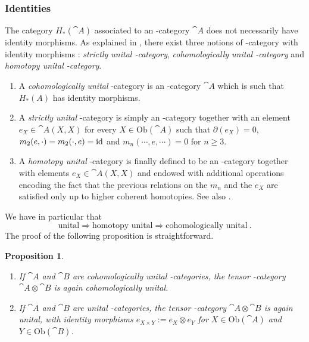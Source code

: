 \documentclass[twoside, 11pt]{amsart}
\newtheorem{proposition}[definition]{Proposition}
\theoremstyle{remark}
\begin{document}
\subsubsection{Identities}

The category $H_*(\cat{A})$ associated to an \Ainf -category $\cat{A}$ does not necessarily have identity morphisms. As explained in \cite[Section 1.2]{Seidel08}, there exist three notions of \Ainf -category with identity morphisms : \textit{strictly unital \Ainf -category}, \textit{cohomologically unital \Ainf -category} and \textit{homotopy unital \Ainf -category}. 
\begin{enumerate}[leftmargin=*]
\item A \textit{cohomologically unital} \Ainf -category is an \Ainf -category $\cat{A}$ which is such that $H_*(A)$ has identity morphisms.
\item A \textit{strictly unital} \Ainf -category is simply an \Ainf -category together with an element $e_X \in \cat{A} (X ,X )$ for every $X \in \mathrm{Ob}(\cat{A})$ such that $\partial (e_X) = 0$, $m_2 (e , \cdot ) = m_2 (\cdot , e ) = \mathrm{id}$ and $m_n ( \cdots , e , \cdots ) = 0 \text { for } n \geq 3$.
\item A \textit{homotopy unital} \Ainf -category is finally defined to be an \Ainf -category together with elements $e_X \in \cat{A} (X ,X )$ and endowed with additional operations encoding the fact that the previous relations on the $m_n$ and the $e_X$ are satisfied only up to higher coherent homotopies. See also \cite[Section 6.1]{HirshMilles12}.
\end{enumerate}
We have in particular that
\[  \text{unital} \Rightarrow \text{homotopy unital} \Rightarrow \text{cohomologically unital} \ . \]
The proof of the following proposition is straightforward.

\begin{proposition}
\begin{enumerate}[leftmargin=*]
\item If $\cat{A}$ and $\cat{B}$ are cohomologically unital \Ainf -categories, the tensor \Ainf -category $\cat{A} \otimes \cat{B}$ is again cohomologically unital. 
\item If $\cat{A}$ and $\cat{B}$ are unital \Ainf -categories, the tensor \Ainf -category $\cat{A} \otimes \cat{B}$ is again unital, with identity morphisms $e_{X \times Y} := e_X \otimes e_Y$ for  $X \in \mathrm{Ob}(\cat{A})$ and $Y \in \mathrm{Ob}(\cat{B})$.
\end{enumerate}
\end{proposition}
\end{document}
